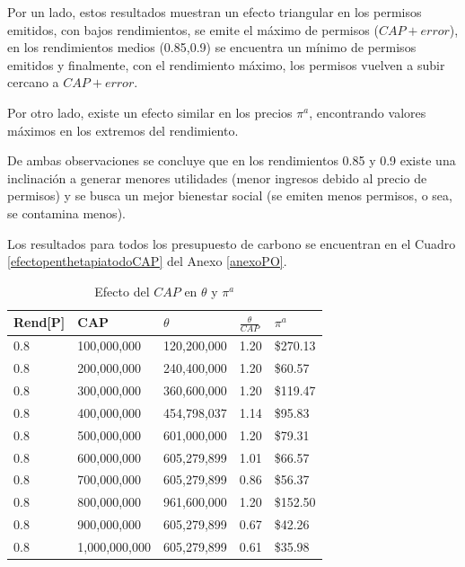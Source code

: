 Por un lado, estos resultados muestran un efecto triangular en los permisos emitidos, con bajos rendimientos, se emite el máximo de permisos ($CAP + error$), en los rendimientos medios (0.85,0.9) se encuentra un mínimo de permisos emitidos y finalmente, con el rendimiento máximo, los permisos vuelven a subir cercano a $CAP + error$.
\vspace{2.5mm}

Por otro lado, existe un efecto similar en los precios $\pi^a$, encontrando valores máximos en los extremos del rendimiento.
\vspace{2.5mm}

De ambas observaciones se concluye que en los rendimientos 0.85 y 0.9 existe una inclinación a generar menores utilidades (menor ingresos debido al precio de permisos) y se busca un mejor bienestar social (se emiten menos permisos, o sea, se contamina menos).
\vspace{2.5mm}

Los resultados para todos los presupuesto de carbono se encuentran en el Cuadro \ref{efectopenthetapiatodoCAP} del Anexo \ref{anexoPO}.
\vspace{2.5mm}

\begin{table}[H]
    \centering
    \begin{tabular}{|l|l|l|l|l|}
    \hline
        Rend[P]  & CAP & $\theta$  & $\frac{\theta}{CAP}$  & $\pi^a$  \\ \hline
         0.8 & 100,000,000 & 120,200,000 & 1.20 &  \$270.13   \\ \hline
        0.8 & 200,000,000 & 240,400,000 & 1.20 &  \$60.57   \\ \hline
        0.8 & 300,000,000 & 360,600,000 & 1.20 &  \$119.47   \\ \hline
        0.8 & 400,000,000 & 454,798,037 & 1.14 &  \$95.83   \\ \hline
        0.8 & 500,000,000 & 601,000,000 & 1.20 &  \$79.31   \\ \hline
        0.8 & 600,000,000 & 605,279,899 & 1.01 &  \$66.57   \\ \hline
        0.8 & 700,000,000 & 605,279,899 & 0.86 &  \$56.37   \\ \hline
        0.8 & 800,000,000 & 961,600,000 & 1.20 &  \$152.50   \\ \hline
        0.8 & 900,000,000 & 605,279,899 & 0.67 &  \$42.26   \\ \hline
        0.8 & 1,000,000,000 & 605,279,899 & 0.61 &  \$35.98   \\ \hline
    \end{tabular}
    \caption{{\footnotesize Efecto del $CAP$ en $\theta$ y $\pi^a$}}
    \label{efectocapthetapia}
\end{table}
\vspace{2.5mm}


